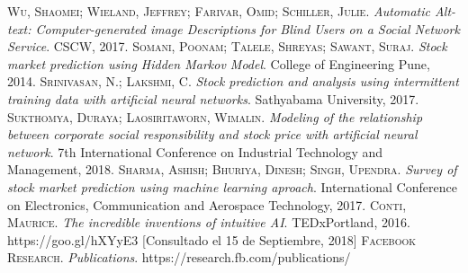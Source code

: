 \documentclass{article}
\begin{document}
\begin{thebibliography}{99}
	\textsc{Wu, Shaomei; Wieland, Jeffrey; Farivar, Omid; Schiller, Julie}. \textit{Automatic Alt-text: Computer-generated image Descriptions for Blind Users on a Social Network Service}. CSCW, 2017.
	 \textsc{Somani, Poonam; Talele, Shreyas; Sawant, Suraj}. \textit{Stock market prediction using Hidden Markov Model}. College of Engineering Pune, 2014.
	\textsc{Srinivasan, N.; Lakshmi, C}. \textit{Stock prediction and analysis using intermittent training data with artificial neural networks}. Sathyabama University, 2017.
	\textsc{Sukthomya, Duraya; Laosiritaworn, Wimalin}. \textit{Modeling of the relationship between corporate social responsibility and stock price with artificial neural network}. 7th International Conference on Industrial Technology and Management, 2018.
	\textsc{Sharma, Ashish; Bhuriya, Dinesh; Singh, Upendra}. \textit{Survey of stock market prediction using machine learning aproach}. International Conference on Electronics, Communication and Aerospace Technology, 2017.
	\textsc{Conti, Maurice}. \textit{The incredible inventions of intuitive AI}. TEDxPortland, 2016. https://goo.gl/hXYyE3 [Consultado el 15 de Septiembre, 2018]
	\textsc{Facebook Research}. \textit{Publications}. https://research.fb.com/publications/
\end{thebibliography}
\end{document}
